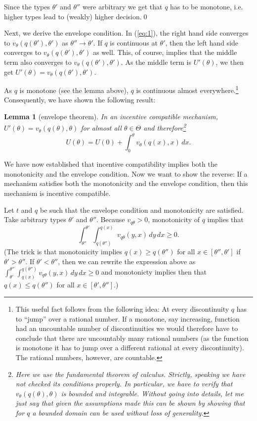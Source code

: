 \documentclass[12pt]{article}
\newtheorem{lemma}{Lemma}
\begin{document}
Since the types $\theta '$ and $\theta ''$ were arbitrary we get that $q$ has to be monotone, i.e. higher types lead to (weakly) higher decision.\qed

Next, we derive the envelope condition. In (\ref{eq:1}), the right hand side converges to $v_\theta (q(\theta '),\theta ')$ as $\theta ''\rightarrow\theta '$. If $q$ is continuous at $\theta '$, then the left hand side converges to $v_\theta (q(\theta '),\theta ')$ as well. This, of course, implies that the middle term also converges to $v_\theta (q(\theta '),\theta ')$. As the middle term is $U'(\theta )$, we then get $U'(\theta )=v_\theta (q(\theta '),\theta ')$. 
 
As $q$ is monotone (see the lemma above), $q$ is continuous almost everywhere.\footnote{This useful fact follows from the following idea: At every discontinuity $q$ has to ``jump'' over a rational number. If a monotone, say increasing, function had an uncountable number of discontinuities we would therefore have to conclude that there are uncountably many rational numbers (as the function is monotone it has to jump over a different rational at every discontinuity). The rational numbers, however, are countable.  } Consequently, we have shown the following result:
\begin{lemma}[envelope theorem]
  In an incentive compatible mechanism, $U'(\theta )=v_\theta (q(\theta ),\theta )$ for almost all $\theta \in\Theta $ and therefore\footnote{Here we use the fundamental theorem of calculus. Strictly, speaking we have not checked its conditions properly. In particular, we have to verify that $v_\theta (q(\theta ),\theta )$ is bounded and integrable. Without going into details, let me just say that given the assumptions made this can be shown by showing that for $q$ a bounded domain can be used without loss of generality.}
  \begin{equation}\tag{envelope condition}
    U(\theta )=U(0)+\int_0^\theta v_\theta (q(x),x)\,dx.
  \end{equation}
\end{lemma}

We have now established that incentive compatibility implies both the monotonicity and the envelope condition. Now we want to show the reverse: If a mechanism satisfies both the monotonicity and the envelope condition, then this mechanism is incentive compatible.

Let $t$ and $q$ be such that the envelope condition and monotonicity are satisfied. Take arbitrary types $\theta '$ and $\theta ''$. Because $v_{q\theta }>0$, monotonicity of $q$ implies that
\begin{equation}\label{eq:3}
  \int_{\theta ''}^{\theta '}\int_{q(\theta '')}^{q(x)}v_{q\theta }(y,x)\,dy\,dx\geq 0.
\end{equation}
(The trick is that monotonicity implies $q(x)\geq q(\theta '')$ for all $x\in[\theta '',\theta ']$ if $\theta '>\theta ''$. If $\theta '<\theta ''$, then we can rewrite the expression above as $\int_{\theta '}^{\theta ''}\int^{q(\theta '')}_{q(x)}v_{q\theta }(y,x)\,dy\,dx\geq 0$ and monotonicty implies then that $q(x)\leq q(\theta '')$ for all $x\in[\theta ',\theta '']$.) 
\end{document}

